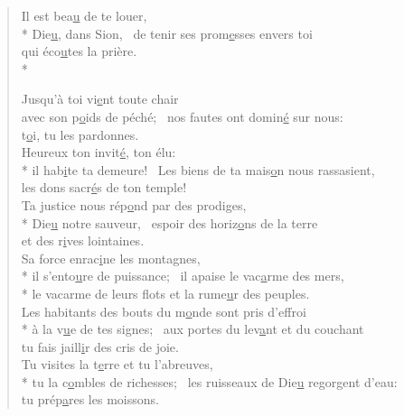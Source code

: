 
\begin{verse}
Il est bea\underline{u} de te louer, \\*
Die\underline{u}, dans Sion,~\psalmstar
de tenir ses prom\underline{e}sses envers toi \\
qui éco\underline{u}tes la prière. \\*

Jusqu’à toi vi\underline{e}nt toute chair \\
avec son p\underline{o}ids de péché;~\psalmstar
nos fautes ont domin\underline{é} sur nous: \\
t\underline{o}i, tu les pardonnes. \\

Heureux ton invit\underline{é}, ton élu: \\*
il hab\underline{i}te ta demeure!~\psalmstar
Les biens de ta mais\underline{o}n nous rassasient, \\
les dons sacr\underline{é}s de ton temple! \\

Ta justice nous rép\underline{o}nd par des prodiges, \\*
Die\underline{u} notre sauveur,~\psalmstar
espoir des horiz\underline{o}ns de la terre \\
et des r\underline{i}ves lointaines. \\

Sa force enrac\underline{i}ne les montagnes, \\*
il s’ento\underline{u}re de puissance;~\psalmstar
{}il apaise le vac\underline{a}rme des mers, \\*
le vacarme de leurs flots
et la rume\underline{u}r des peuples. \\

Les habitants des bouts du m\underline{o}nde sont pris d’effroi \\*
à la v\underline{u}e de tes signes;~\psalmstar
aux portes du lev\underline{a}nt et du couchant \\
tu fais jaill\underline{i}r des cris de joie. \\

Tu visites la t\underline{e}rre et tu l’abreuves, \\*
tu la c\underline{o}mbles de richesses;~\psalmstar
les ruisseaux de Die\underline{u} regorgent d’eau: \\
tu prép\underline{a}res les moissons. \\


\end{verse}
